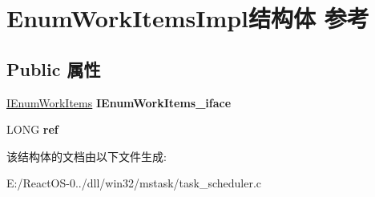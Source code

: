 \hypertarget{struct_enum_work_items_impl}{}\section{Enum\+Work\+Items\+Impl结构体 参考}
\label{struct_enum_work_items_impl}
\subsection*{Public 属性}
\begin{DoxyCompactItemize}
\item 
\mbox{\label{struct_enum_work_items_impl_a748d5b2a9733b76799bcd00f65ee0eef}} 
\hyperlink{interface_i_enum_work_items}{I\+Enum\+Work\+Items} {\bfseries I\+Enum\+Work\+Items\+\_\+iface}
\item 
\mbox{\label{struct_enum_work_items_impl_ac31b75114c05c9a2cf331ae90e2f082b}} 
L\+O\+NG {\bfseries ref}
\end{DoxyCompactItemize}


该结构体的文档由以下文件生成\+:\begin{DoxyCompactItemize}
\item 
E\+:/\+React\+O\+S-\/0../dll/win32/mstask/task\+\_\+scheduler.\+c\end{DoxyCompactItemize}
